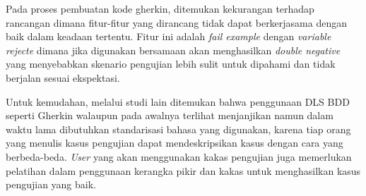 Pada proses pembuatan kode gherkin, ditemukan kekurangan terhadap rancangan dimana fitur-fitur yang dirancang
tidak dapat berkerjasama dengan baik dalam keadaan tertentu. Fitur ini adalah \emph{fail example} dengan \emph{variable rejecte}
dimana jika digunakan bersamaan akan menghasilkan \emph{double negative} yang menyebabkan skenario pengujian lebih
sulit untuk dipahami dan tidak berjalan sesuai ekspektasi.

Untuk kemudahan, melalui studi lain \cite{dsl_lesson} ditemukan bahwa penggunaan DLS BDD seperti Gherkin walaupun
pada awalnya terlihat menjanjikan namun dalam waktu lama dibutuhkan standarisasi bahasa yang digunakan, karena tiap
orang yang menulis kasus pengujian dapat mendeskripsikan kasus dengan cara yang berbeda-beda. \emph{User} yang
akan menggunakan kakas pengujian juga memerlukan pelatihan dalam penggunaan kerangka pikir dan kakas untuk menghasilkan
kasus pengujian yang baik.


